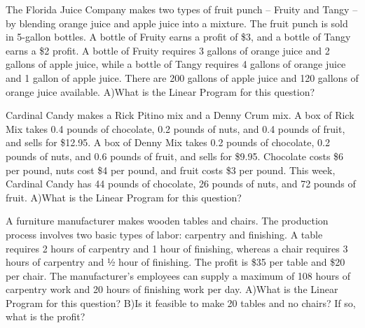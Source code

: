 \documentclass[11pt,epsfig]{article}
\begin{document}
\newpage

\begin{problem}{15}
The Florida Juice Company makes two types of fruit punch – Fruity and Tangy – by blending orange juice and apple juice into a mixture. The fruit punch is sold in 5-gallon bottles. A bottle of Fruity earns a profit of \$3, and a bottle of Tangy earns a \$2 profit. A bottle of Fruity requires 3 gallons of orange juice and 2 gallons of apple juice, while a bottle of Tangy requires 4 gallons of orange juice and 1 gallon of apple juice. There are 200 gallons of apple juice and 120 gallons of orange juice available.
\newline
A)What is the Linear Program for this question?
\vfill
\end{problem}


\begin{problem}{15}
Cardinal Candy makes a Rick Pitino mix and a Denny Crum mix. A box of Rick Mix takes 0.4 pounds of chocolate, 0.2 pounds of nuts, and 0.4 pounds of fruit, and sells for \$12.95. A box of Denny Mix takes 0.2 pounds of chocolate, 0.2 pounds of nuts, and 0.6 pounds of fruit, and sells for \$9.95. Chocolate costs \$6 per pound, nuts cost \$4 per pound, and fruit costs \$3 per pound. This week, Cardinal Candy has 44 pounds of chocolate, 26 pounds of nuts, and 72 pounds of fruit.
\newline
A)What is the Linear Program for this question?

\vfill
\end{problem}






\newpage

\begin{problem}{20}
A furniture manufacturer makes wooden tables and chairs. The production process involves two basic types of labor: carpentry and finishing. A table requires 2 hours of carpentry and 1 hour of finishing, whereas a chair requires 3 hours of carpentry and ½ hour of finishing. The profit is \$35 per table and \$20 per chair. The manufacturer's employees can supply a maximum of 108 hours of carpentry work and 20 hours of finishing work per day.
\newline
A)What is the Linear Program for this question?
\newline
B)Is it feasible to make 20 tables and no chairs? If so, what is the profit?
\vfill
\end{problem}
\end{document}
